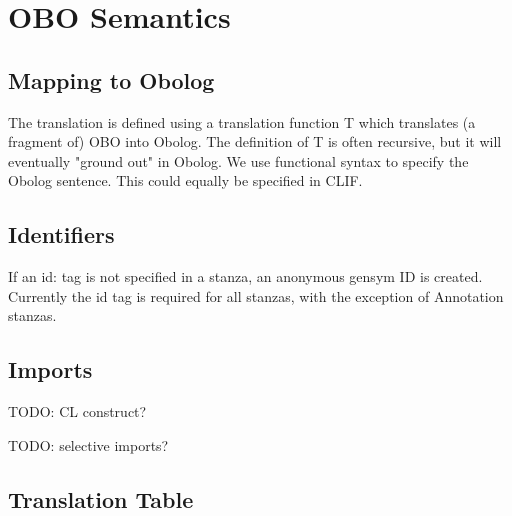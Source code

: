 \section{OBO Semantics}

\subsection{Mapping to Obolog}

The translation is defined using a translation function T which
translates (a fragment of) OBO into Obolog. The definition of T is
often recursive, but it will eventually "ground out" in Obolog. We use
functional syntax to specify the Obolog sentence. This could equally
be specified in CLIF.

\subsection{Identifiers}

If an id: tag is not specified in a stanza, an anonymous gensym ID is
created. Currently the id tag is required for all stanzas, with the
exception of Annotation stanzas.

\subsection{Imports}

TODO: CL construct?

TODO: selective imports?

\subsection{Translation Table}

